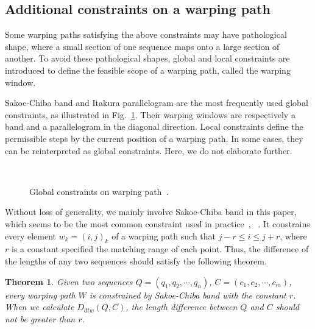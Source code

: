 \documentclass[10pt,journal,compsoc]{IEEEtran}
\newtheorem{theorem}{Theorem}
\begin{document}
\subsection{Additional constraints on a warping path}

Some warping paths satisfying the above constraints may have pathological shape,
where a small section of one sequence maps onto a large section of another.
To avoid these pathological shapes,
global and local constraints are introduced to define the feasible scope of a warping path, called the warping window.

Sakoe-Chiba band and Itakura parallelogram are the most frequently used global constraints,
as illustrated in Fig.~\ref{fig:global constraints}.
Their warping windows are respectively a band and a parallelogram in the diagonal direction.
Local constraints define the permissible steps by the current position of a warping path.
In some cases, they can be reinterpreted as global constraints.
Here, we do not elaborate further.

\begin{figure}[!htbp]
\centering
{}
~~
\caption{Global constraints on warping path~\cite{keogh2005exact}.}
\label{fig:global constraints}
\end{figure}

Without loss of generality, we mainly involve Sakoe-Chiba band in this paper,
which seems to be the most common constraint used in practice~\cite{Rabiner1978Considerations},~\cite{Dynamic1978programming} .
It constrains every element $w_k=(i, j)_k$ of a warping path such that $j-r\leq i \leq j+r$,
where $r$ is a constant specified the matching range of each point.
Thus, the difference of the lengths of any two sequences should satisfy the following theorem.

\begin{theorem} \label{theorem:2}
  Given two sequences $Q=(q_1, q_2, \cdots, q_n)$, $C=(c_1, c_2, \cdots, c_m)$,
  every warping path $W$ is constrained by Sakoe-Chiba band with the constant $r$.
  When we calculate $D_{dtw}(Q,C)$, the length difference between $Q$ and $C$ should not be greater than $r$.
\end{theorem}
\end{document}
